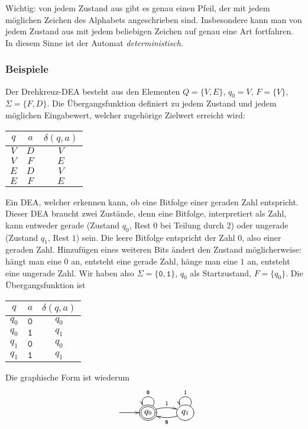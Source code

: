 Wichtig: von jedem Zustand aus gibt es genau einen Pfeil, der mit jedem möglichen
Zeichen des Alphabets angeschrieben sind.
Insbesondere kann man von jedem
Zustand aus mit jedem beliebigen Zeichen auf genau eine Art fortfahren.
%
In diesem Sinne ist der Automat {\em deterministisch}.

\subsubsection{Beispiele}
\begin{beispiel}[\bf Drehkreuz]
Der Drehkreuz-DEA besteht aus den Elementen $Q=\{V,E\}$, $q_0=V$,
$F=\{V\}$, $\Sigma=\{F,D\}$.
Die Übergangsfunktion definiert zu jedem Zustand und jedem möglichen
Eingabewert, welcher zugehörige Zielwert erreicht wird:
\begin{center}
\begin{tabular}{|cc|c|}
\hline
$q$&$a$&$\delta(q,a)$\\
\hline
$V$&$D$&$V$\\
$V$&$F$&$E$\\
$E$&$D$&$V$\\
$E$&$F$&$E$\\
\hline
\end{tabular}
\end{center}
\end{beispiel}
\begin{beispiel}
Ein DEA, welcher erkennen kann, ob eine Bitfolge einer geraden Zahl entspricht.
Dieser DEA braucht zwei Zustände, denn eine Bitfolge, interpretiert
als Zahl, kann entweder gerade (Zustand $q_0$, Rest $0$ bei Teilung durch 2)
oder ungerade (Zustand $q_1$, Rest $1$) sein.
Die leere Bitfolge entspricht der Zahl $0$, also einer geraden Zahl.
Hinzufügen eines weiteren
Bits ändert den Zustand möglicherweise: hängt man eine $0$ an, entsteht
eine gerade Zahl, hänge man eine $1$ an, entsteht eine ungerade Zahl.
Wir haben also $\Sigma=\{\texttt{0},\texttt{1}\}$, $q_0$ als Startzustand,
$F=\{q_0\}$.
Die Übergangsfunktion ist
\begin{center}
\begin{tabular}{|cc|c|}
\hline
$q$&$a$&$\delta(q,a)$\\
\hline
$q_0$&$\texttt{0}$&$q_0$\\
$q_0$&$\texttt{1}$&$q_1$\\
$q_1$&$\texttt{0}$&$q_0$\\
$q_1$&$\texttt{1}$&$q_1$\\
\hline
\end{tabular}
\end{center}
Die graphische Form ist wiederum
\[
\entrymodifiers={++[o][F]}
\xymatrix{
*+\txt{}\ar[r]
	&*++[o][F=]{q_0} \ar@/^/[r]^{\texttt{1}} \ar@(ur,ul)_{\texttt{0}}
		&{q_1} \ar@/^/[l]^{\texttt{0}} \ar@(ur,ul)_{\texttt{1}}
}
\]
\end{beispiel}
